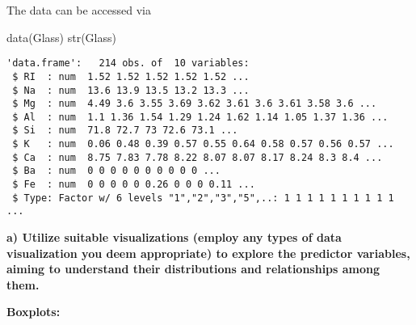 \documentclass[
  letterpaper,
  DIV=11,
  numbers=noendperiod]{scrartcl}
\newenvironment{Shaded}{\begin{snugshade}}{\end{snugshade}}
\newcommand{\AttributeTok}[1]{\textcolor[rgb]{0.40,0.45,0.13}{#1}}
\newcommand{\ControlFlowTok}[1]{\textcolor[rgb]{0.00,0.23,0.31}{#1}}
\newcommand{\DecValTok}[1]{\textcolor[rgb]{0.68,0.00,0.00}{#1}}
\newcommand{\FunctionTok}[1]{\textcolor[rgb]{0.28,0.35,0.67}{#1}}
\newcommand{\NormalTok}[1]{\textcolor[rgb]{0.00,0.23,0.31}{#1}}
\newcommand{\OtherTok}[1]{\textcolor[rgb]{0.00,0.23,0.31}{#1}}
\newcommand{\SpecialCharTok}[1]{\textcolor[rgb]{0.37,0.37,0.37}{#1}}
\newcommand{\StringTok}[1]{\textcolor[rgb]{0.13,0.47,0.30}{#1}}
\begin{document}
The data can be accessed via

\begin{Shaded}
\begin{Highlighting}[]
\FunctionTok{data}\NormalTok{(Glass)}
\FunctionTok{str}\NormalTok{(Glass)}
\end{Highlighting}
\end{Shaded}

\begin{verbatim}
'data.frame':   214 obs. of  10 variables:
 $ RI  : num  1.52 1.52 1.52 1.52 1.52 ...
 $ Na  : num  13.6 13.9 13.5 13.2 13.3 ...
 $ Mg  : num  4.49 3.6 3.55 3.69 3.62 3.61 3.6 3.61 3.58 3.6 ...
 $ Al  : num  1.1 1.36 1.54 1.29 1.24 1.62 1.14 1.05 1.37 1.36 ...
 $ Si  : num  71.8 72.7 73 72.6 73.1 ...
 $ K   : num  0.06 0.48 0.39 0.57 0.55 0.64 0.58 0.57 0.56 0.57 ...
 $ Ca  : num  8.75 7.83 7.78 8.22 8.07 8.07 8.17 8.24 8.3 8.4 ...
 $ Ba  : num  0 0 0 0 0 0 0 0 0 0 ...
 $ Fe  : num  0 0 0 0 0 0.26 0 0 0 0.11 ...
 $ Type: Factor w/ 6 levels "1","2","3","5",..: 1 1 1 1 1 1 1 1 1 1 ...
\end{verbatim}

\textbf{a) Utilize suitable visualizations (employ any types of data
visualization you deem appropriate) to explore the predictor variables,
aiming to understand their distributions and relationships among them.}

\textbf{Boxplots:}

\begin{Shaded}
\end{Shaded}
\end{document}
